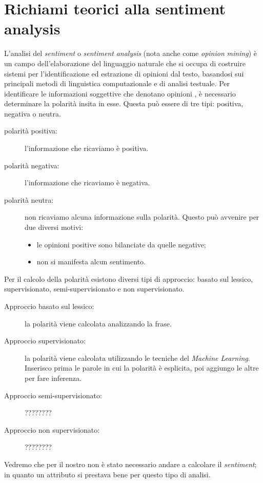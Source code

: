 \chapter{Richiami teorici alla sentiment analysis}
	L'analisi del \textit{sentiment} o \textit{sentiment} \textit{analysis} (nota anche come \textit{opinion} \textit{mining}) è un campo dell'elaborazione del linguaggio naturale che si occupa di costruire sistemi per l'identificazione ed estrazione di opinioni dal testo, basandosi sui principali metodi di linguistica computazionale e di analisi testuale. Per identificare le informazioni soggettive che denotano opinioni , è necessario determinare la polarità insita in esse. Questa può essere di tre tipi: positiva, negativa o neutra.
		
	\begin{description}
		\item [polarità positiva:] l'informazione che ricaviamo è positiva.	
		\item [polarità negativa:] l'informazione che ricaviamo è negativa.
		\item [polarità neutra:] non ricaviamo alcuna informazione sulla polarità. Questo può avvenire per due diversi motivi:
			
		\begin{itemize}
			\item le opinioni positive sono bilanciate da quelle negative;
			\item non si manifesta alcun sentimento.
		\end{itemize}
			
	\end{description}
	
	Per il calcolo della polarità esistono diversi tipi di approccio: basato sul lessico, supervisionato, semi-supervisionato e non supervisionato.
		
	\begin{description}
		\item [Approccio basato sul lessico:] la polarità viene calcolata analizzando la frase.
		\item [Approccio supervisionato:] la polarità viene calcolata utilizzando le tecniche del \textit{Machine Learning}. Inserisco prima le parole in cui la polarità è esplicita, poi aggiungo le altre per fare inferenza.
		\item [Approccio semi-supervisionato:] ????????
		\item [Approccio non supervisionato:] ????????	
	\end{description}
		
	Vedremo che per il nostro non è stato necessario andare a calcolare il \textit{sentiment}; in quanto un attributo si prestava bene per questo tipo di analisi.